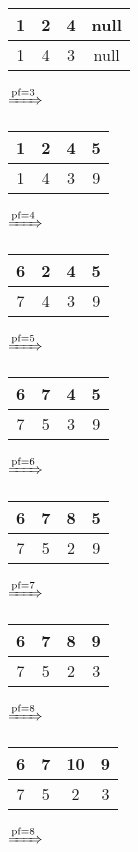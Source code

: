 \documentclass{article}
\begin{document}
\begin{enumerate}
\begin{tabular}{|c|c|c|c|}
            \hline
            1 & 2 & 4 & null\\
            \hline
            1 & 4 & 3 & null\\
            \hline
         \end{tabular}
         $\xRightarrow{\text{pf}=3}$
         \begin{tabular}{|c|c|c|c|}
            \hline
            1 & 2 & 4 & 5\\
            \hline
            1 & 4 & 3 & 9\\
            \hline
         \end{tabular}
         $\xRightarrow{\text{pf}=4}$
         \begin{tabular}{|c|c|c|c|}
            \hline
            6 & 2 & 4 & 5\\
            \hline
            7 & 4 & 3 & 9\\
            \hline
         \end{tabular}
         $\xRightarrow{\text{pf}=5}$
         \begin{tabular}{|c|c|c|c|}
            \hline
            6 & 7 & 4 & 5\\
            \hline
            7 & 5 & 3 & 9\\
            \hline
         \end{tabular}
         $\xRightarrow{\text{pf}=6}$
         \begin{tabular}{|c|c|c|c|}
            \hline
            6 & 7 & 8 & 5\\
            \hline
            7 & 5 & 2 & 9\\
            \hline
         \end{tabular}
         $\xRightarrow{\text{pf}=7}$
         \begin{tabular}{|c|c|c|c|}
            \hline
            6 & 7 & 8 & 9\\
            \hline
            7 & 5 & 2 & 3\\
            \hline
         \end{tabular}
         $\xRightarrow{\text{pf}=8}$
         \begin{tabular}{|c|c|c|c|}
            \hline
            6 & 7 & 10 & 9\\
            \hline
            7 & 5 & 2 & 3\\
            \hline
         \end{tabular}
         $\xRightarrow{\text{pf}=8}$
         \begin{tabular}{|c|c|c|c|}
            \hline

\end{tabular}
\end{enumerate}
\end{document}
